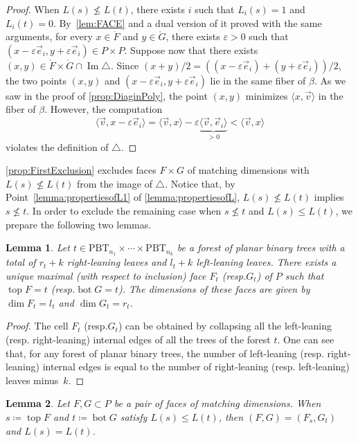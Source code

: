 \documentclass[10pt,a4paper]{amsart}
\newcommand{\resp}{resp.\xspace}
\numberwithin{equation}{section}\providecommand{\No}{}
\theoremstyle{plain}
\newtheorem{lemma}{Lemma}
\theoremstyle{definition}
\newcommand{\Tam}[1]{\mathrm{PBT}_{#1}}
\DeclareMathOperator{\tp}{top}
\DeclareMathOperator{\bm}{bot}
\newcommand{\ang}[1]{\langle #1\rangle}
\DeclareMathOperator{\im}{\mathrm{Im}}
\begin{document}
\begin{proof}
When $L(s)\not\leq L(t)$, there exists $i$ such that $L_i(s) = 1$ and $L_i(t) = 0$.
By~\cref{lem:FACE} and a dual version of it proved with the same arguments,
for every $x\in \mathring{F}$ and $y\in \mathring{G}$, there exists $\varepsilon>0$ such that $(x-\varepsilon \vec e_i, y+\varepsilon \vec e_i) \in P\times P$.
Suppose now that there exists $(x,y)\in \mathring{F}\times \mathring{G} \cap \im \triangle$.
Since $(x+y)/2 = ((x-\varepsilon\vec e_i)+(y+\varepsilon\vec e_i))/2$, the two points $(x, y)$ and $(x-\varepsilon\vec e_i, y+\varepsilon\vec e_i)$ lie in the same fiber of $\beta$. As we saw in the proof of
\cref{prop:DiaginPoly}, the point $(x,y)$ minimizes $\ang{x, \vec v}$ in the fiber of $\beta$.
However, the computation
\[
\ang{\vec v, x-\varepsilon \vec e_i}=\ang{\vec v, x}-\varepsilon\underbrace{\ang{\vec v, \vec e_i}}_{>0}
<\ang{\vec v, x}
\]
violates the definition of $\triangle$.
\end{proof}

\cref{prop:FirstExclusion} excludes
faces $F\times G$ of matching dimensions with $L(s)\not\leq L(t)$
from the image of $\triangle$.
Notice that, by Point~\eqref{lemma:propertiesofL1} of \cref{lemma:propertiesofL}, $L(s)\not\leq L(t)$ implies $s\not \leq t$.
In order to exclude the remaining case when $s\not\leq t$ and $L(s)\leq L(t)$, we prepare the following two lemmas.

\begin{lemma}\label{lem:UniqueFG}
Let $t\in \Tam{n_1}\times \cdots \times \Tam{n_k}$ be a forest of planar binary trees with a total of $r_t+k$ right-leaning leaves and $l_t+k$ left-leaning leaves. There exists a unique maximal (with respect to inclusion) face $F_t$ (\resp $G_t$) of $P$ such that \hbox{$\tp F\!=\!t$} (\resp $\bm G = t$). The dimensions of these faces are given by $\dim F_t =l_t$ and $\dim G_t = r_t$.
\end{lemma}

\begin{proof}
The cell $F_t$ (\resp $G_t$) can be obtained by collapsing all the left-leaning (\resp right-leaning) internal edges of all the trees of the forest $t$. One can see that, for any forest of planar binary trees, the number of left-leaning (\resp right-leaning) internal edges is equal to the number of right-leaning (\resp left-leaning) leaves minus~$k$.
\end{proof}

\begin{lemma}\label{lemma:Matching}
Let $F,G\subset P$ be a pair of faces of matching dimensions.
When $s\coloneqq \tp F$ and $t\coloneqq \bm G$ satisfy $L(s)\leq L(t)$, then $(F, G) = (F_s, G_t)$ and $L(s)=L(t)$.
\end{lemma}
\end{document}
